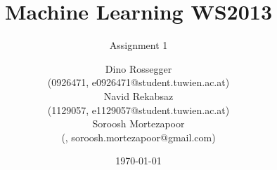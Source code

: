 \title{Machine Learning WS2013}
\subtitle{Assignment 1 \\[0.8cm] {\rmfamily\normalfont\Large}}

\author{
Dino Rossegger \\{\small (0926471, e0926471@student.tuwien.ac.at)}\\
Navid Rekabsaz \\{\small (1129057, e1129057@student.tuwien.ac.at)}\\
Soroosh Mortezapoor \\{\small (, soroosh.mortezapoor@gmail.com)}\\
}

\date{\today}



